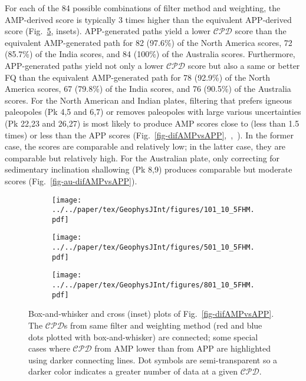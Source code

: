 For each of the 84 possible combinations of filter method and weighting, the
AMP-derived score is typically 3 times higher than the equivalent
APP-derived score (Fig.~\ref{fig-boxAMPvsAPP}, insets). APP-generated paths
yield a lower $\mathcal{CPD}$ score than the equivalent AMP-generated path for
82 (97.6\%) of the North America scores, 72 (85.7\%) of the India scores, and 84
(100\%) of the Australia scores. Furthermore, APP-generated paths yield not only
a lower $\mathcal{CPD}$ score but also a same or better FQ than the equivalent
AMP-generated path for 78 (92.9\%) of the North America scores, 67 (79.8\%) of
the India scores, and 76 (90.5\%) of the Australia scores. For the North
American and Indian plates, filtering that prefers igneous paleopoles (Pk 4,5
and 6,7) or removes paleopoles with large various uncertainties (Pk 22,23 and
26,27) is most likely to produce AMP scores close to (less than 1.5 times) or
less than the APP scores
(Fig.~\ref{fig-difAMPvsAPP},~,~).
In the former case, the scores are comparable and relatively low; in the latter
case, they are comparable but relatively high. For the Australian plate, only
correcting for sedimentary inclination shallowing (Pk 8,9) produces comparable
but moderate scores (Fig.~\ref{fig-au-difAMPvsAPP}).

\begin{figure}[tbp]
  \centering
  \begin{subfigure}{.92\textwidth}
    \texttt{[image: ../../paper/tex/GeophysJInt/figures/101\_10\_5FHM.pdf]}
    \caption{}\label{fig-na-boxAMPvsAPP}
  \end{subfigure}
  \vspace{.1em}
  \begin{subfigure}{1\textwidth}
    \texttt{[image: ../../paper/tex/GeophysJInt/figures/501\_10\_5FHM.pdf]}
    \caption{}\label{fig-in-boxAMPvsAPP}
  \end{subfigure}
  \vspace{.1em}
  \begin{subfigure}{1\textwidth}
    \texttt{[image: ../../paper/tex/GeophysJInt/figures/801\_10\_5FHM.pdf]}
    \caption{}\label{fig-au-boxAMPvsAPP}
  \end{subfigure}
\end{figure}
\begin{figure}[!ht]
  \ContinuedFloat\caption[Box-and-whisker and cross (inset) plots of
    Fig.~\ref{fig-difAMPvsAPP}]{Box-and-whisker and cross (inset) plots of
    Fig.~\ref{fig-difAMPvsAPP}. The $\mathcal{CPD}$s from same filter and weighting
    method (red and blue dots plotted with box-and-whisker) are connected; some
    special cases where $\mathcal{CPD}$ from AMP lower than from APP are highlighted
    using darker connecting lines. Dot symbols are semi-transparent so a darker
    color indicates a greater number of data at a given
    $\mathcal{CPD}$.}\label{fig-boxAMPvsAPP}
\end{figure}


